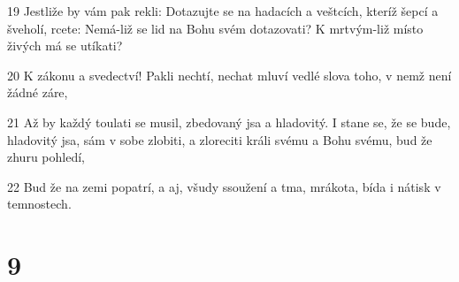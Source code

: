 \par 19 Jestliže by vám pak rekli: Dotazujte se na hadacích a veštcích, kteríž šepcí a šveholí, rcete: Nemá-liž se lid na Bohu svém dotazovati? K mrtvým-liž místo živých má se utíkati?
\par 20 K zákonu a svedectví! Pakli nechtí, nechat mluví vedlé slova toho, v nemž není žádné záre,
\par 21 Až by každý toulati se musil, zbedovaný jsa a hladovitý. I stane se, že se bude, hladovitý jsa, sám v sobe zlobiti, a zloreciti králi svému a Bohu svému, bud že zhuru pohledí,
\par 22 Bud že na zemi popatrí, a aj, všudy ssoužení a tma, mrákota, bída i nátisk v temnostech.

\chapter{9}


